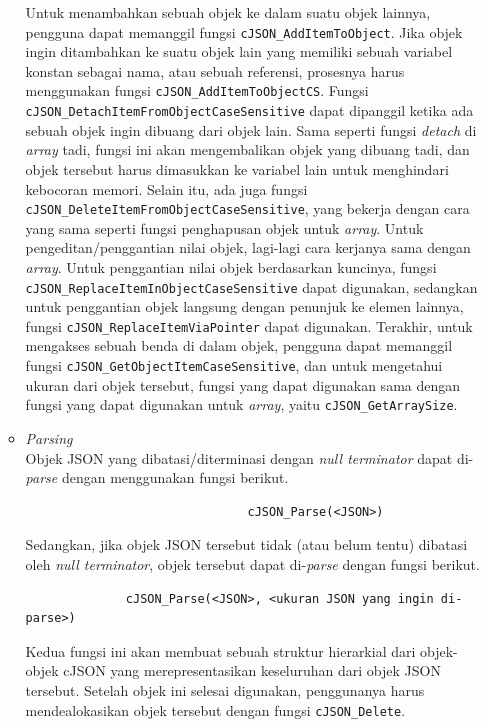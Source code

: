 \documentclass[a4paper,twoside]{article}
\begin{document}
\begin{enumerate}
\begin{itemize}
	Untuk menambahkan sebuah objek ke dalam suatu objek lainnya, pengguna dapat memanggil fungsi \verb|cJSON_AddItemToObject|. Jika objek ingin ditambahkan ke suatu objek lain yang memiliki sebuah variabel konstan sebagai nama, atau sebuah referensi, prosesnya harus menggunakan fungsi \verb|cJSON_AddItemToObjectCS|.
	Fungsi \verb|cJSON_DetachItemFromObjectCaseSensitive| dapat dipanggil ketika ada sebuah objek ingin dibuang dari objek lain. Sama seperti fungsi \textit{detach} di \textit{array} tadi, fungsi ini akan mengembalikan objek yang dibuang tadi, dan objek tersebut harus dimasukkan ke variabel lain untuk menghindari kebocoran memori. Selain itu, ada juga fungsi \verb|cJSON_DeleteItemFromObjectCaseSensitive|, yang bekerja dengan cara yang sama seperti fungsi penghapusan objek untuk \textit{array}.
	Untuk pengeditan/penggantian nilai objek, lagi-lagi cara kerjanya sama dengan \textit{array}. Untuk penggantian nilai objek berdasarkan kuncinya, fungsi \verb|cJSON_ReplaceItemInObjectCaseSensitive| dapat digunakan, sedangkan untuk penggantian objek langsung dengan penunjuk ke elemen lainnya, fungsi \verb|cJSON_ReplaceItemViaPointer| dapat digunakan.
	Terakhir, untuk mengakses sebuah benda di dalam objek, pengguna dapat memanggil fungsi \verb|cJSON_GetObjectItemCaseSensitive|, dan untuk mengetahui ukuran dari objek tersebut, fungsi yang dapat digunakan sama dengan fungsi yang dapat digunakan untuk \textit{array}, yaitu \verb|cJSON_GetArraySize|.
	\item \textit{Parsing}\\
	Objek JSON yang dibatasi/diterminasi dengan \textit{null terminator} dapat di-\textit{parse} dengan menggunakan fungsi berikut.
	
	\begin{verbatim}
                               cJSON_Parse(<JSON>)
	\end{verbatim}
	
	Sedangkan, jika objek JSON tersebut tidak (atau belum tentu) dibatasi oleh \textit{null terminator}, objek tersebut dapat di-\textit{parse} dengan fungsi berikut.
	
	\begin{verbatim}
              cJSON_Parse(<JSON>, <ukuran JSON yang ingin di-parse>)
	\end{verbatim}
	
	Kedua fungsi ini akan membuat sebuah struktur hierarkial dari objek-objek cJSON yang merepresentasikan keseluruhan dari objek JSON tersebut. Setelah objek ini selesai digunakan, penggunanya harus mendealokasikan objek tersebut dengan fungsi \verb|cJSON_Delete|.
\end{itemize}


\end{enumerate}
\end{document}
